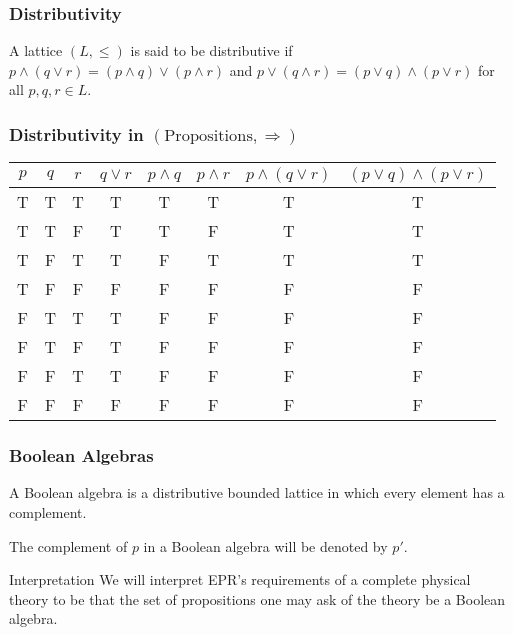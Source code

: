 \documentclass{beamer}
\begin{document}
\begin{frame}

	\frametitle{Distributivity}

	\begin{definition}
	
		A lattice $(L,\leq)$ is said to be distributive if $p\wedge(q\vee r)=(p\wedge q)\vee(p\wedge r)$ and $p\vee (q\wedge r)=(p\vee q)\wedge (p\vee r)$ for all $p,q,r\in L$.	
	
	\end{definition}

\end{frame}

\begin{frame}

	\frametitle{Distributivity in $(\text{Propositions},\Rightarrow)$}

	\center
	\begin{tabular}{|c|c|c|c|c|c|c|c|}
	\hline
	$p$ & $q$ & $r$ & $q\vee r$ & $p\wedge q$ & $p\wedge r$ & $p\wedge(q\vee r)$ & $(p\vee q)\wedge(p\vee r)$ \\
	\hline
	T & T & T & T & T & T & T & T \\
	T & T & F & T & T & F & T & T \\
	T & F & T & T & F & T & T & T \\
	T & F & F & F & F & F & F & F \\
	F & T & T & T & F & F & F & F \\
	F & T & F & T & F & F & F & F \\
	F & F & T & T & F & F & F & F \\
	F & F & F & F & F & F & F & F \\
	\hline
	\end{tabular}

\end{frame}

\begin{frame}

	\frametitle{Boolean Algebras}
	
	\begin{definition}
	
		A Boolean algebra is a distributive bounded lattice in which every element has a complement.	
	
	\end{definition}

	The complement of $p$ in a Boolean algebra will be denoted by $p'$.

	\begin{alertblock}{Interpretation}
		We will interpret EPR's requirements of a complete physical theory to be that the set of propositions one may ask of the theory be a Boolean algebra.
	\end{alertblock}

\end{frame}
\end{document}
